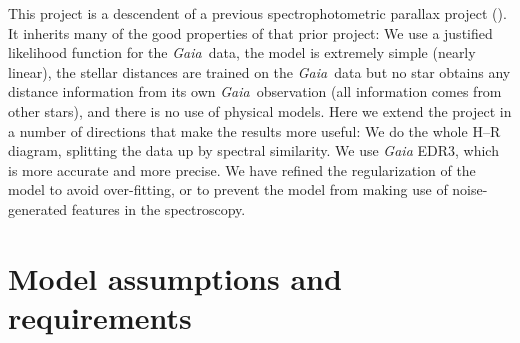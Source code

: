 \documentclass[modern]{aastex631}
\newcommand{\acronym}[1]{{\small{#1}}}
\newcommand{\project}[1]{\textsl{#1}}
\newcommand{\Gaia}{\project{Gaia}}
\begin{document}
This project is a descendent of a previous spectrophotometric parallax project
(\citealt{her}).
It inherits many of the good properties of that prior project:
We use a justified likelihood function for the \Gaia\ data,
the model is extremely simple (nearly linear),
the stellar distances are trained on the \Gaia\ data but no star obtains
any distance information from its own \Gaia\ observation (all information
comes from other stars),
and there is no use of physical models.
Here we extend the project in a number of directions that make the results
more useful:
We do the whole H--R diagram, splitting the data up by spectral similarity.
We use \Gaia{} \acronym{EDR3}, which is more accurate and more precise.
We have refined the regularization of the model to avoid over-fitting, or to prevent
the model from making use of noise-generated features in the spectroscopy.

\section{Model assumptions and requirements}\label{sec:assumptions}
\end{document}

